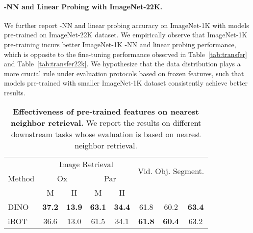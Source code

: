 \documentclass{article} \usepackage{iclr2022_conference,times}
\def\ourmethod{{iBOT}\xspace}
\begin{document}
\begin{table}[!tbp]
\captionsetup{width=0.98\linewidth}
\caption{\textbf{-NN and linear probing on ImageNet-1K with different pre-training datasets}.}
\label{tab:linear22k}
\vspace{-0.2cm}
\centering
{}
\end{table}

\paragraph{-NN and Linear Probing with ImageNet-22K.} 
We further report -NN and linear probing accuracy on ImageNet-1K with models pre-trained on ImageNet-22K dataset. We empirically observe that ImageNet-1K pre-training incurs better ImageNet-1K -NN and linear probing performance, which is opposite to the fine-tuning performance observed in Table~\ref{tab:transfer} and Table~\ref{tab:transfer22k}. We hypothesize that the data distribution plays a more crucial rule under evaluation protocols based on frozen features, such that models pre-trained with smaller ImageNet-1K dataset consistently achieve better results.

\begin{table}[!tbp]
\caption{\textbf{Effectiveness of pre-trained features on nearest neighbor retrieval.} We report the results on different downstream tasks whose evaluation is based on nearest neighbor retrieval.}
\label{tab:retrival}
\vspace{-0.2cm}
\centering
\begin{tabular}{lccccccc}
\multirow{3}{*}{Method} & \multicolumn{4}{c}{Image Retrieval} & 
\multicolumn{3}{c}{\multirow{2}{*}{Vid. Obj. Segment.}}\\
& \multicolumn{2}{c}{Ox} & \multicolumn{2}{c}{Par}\\
\cmidrule(lr){2-5}\cmidrule(lr){6-8}
& M & H & M & H &  &  &   \\
\toprule
DINO & \bf 37.2 & \bf 13.9 & \bf 63.1 & \bf 34.4 & 61.8 & 60.2 & \bf 63.4 \\
\rowcolor{cyan!50}
\ourmethod & 36.6 & 13.0 & 61.5 & 34.1 & \bf 61.8 & \bf 60.4 & 63.2 \\
\bottomrule
\end{tabular}
\end{table}
\end{document}
